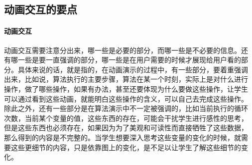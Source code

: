 \subsection{动画交互的要点}
\paragraph{动画交互}
动画交互需要注意分出来，哪一些是必要的部分，而哪一些是不必要的信息。还
有哪一些是要一直强调的部分，哪一些是在用户需要的时候才展现给用户看的部
分。具体来说的话，就是指的，在动画演示的过程中，有一些部分，要着重强调
出来，比如说，算法执行的主要步骤，算法在某一个时刻，实际上是对什么进行
操作，做了哪些操作，如果有办法，甚至还要体现为什么要做这些操作，让学生
可以通过看到这些动画，就能明白这些操作的含义，可以自己去完成这些操作。
除此之外，还有一些部分是在算法演示中不一定被强调的，比如当前执行的循环
次数，当前某个变量的值，这些东西的存在，可能会干扰学生进行感性的思考，
但是这些东西也必须存在，如果因为为了美观和可读性而直接牺牲了这些数据，
那么得到的内容是不完整的。当学生想要深入思考这些变量的变化的时候，就需
要这些更细节的内容，只是依靠图上的变化，是不足以让学生了解这些细节的变
化。
